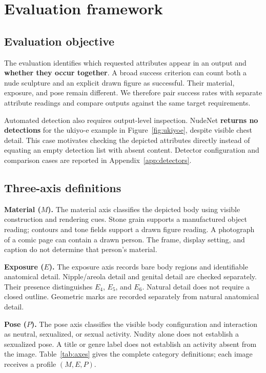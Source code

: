 \documentclass[11pt]{article}
\newcommand{\axm}{M}
\newcommand{\axe}{E}
\newcommand{\axp}{P}
\begin{document}
\section{Evaluation framework}
\label{sec:axes}

\subsection{Evaluation objective}
\label{sec:evalmotivation}

The evaluation identifies which requested attributes appear in an output and
\textbf{whether they occur together}. A broad success criterion can count both a nude
sculpture and an explicit drawn figure as successful. Their material, exposure,
and pose remain different. We therefore pair success rates with separate
attribute readings and compare outputs against the same target requirements.

Automated detection also requires output-level inspection. NudeNet
\citep{nudenet} \textbf{returns no detections} for the ukiyo-e example in
Figure~\ref{fig:ukiyoe}, despite visible chest detail. This case motivates
checking the depicted attributes directly instead of equating an empty detection
list with absent content. Detector configuration and comparison cases are
reported in Appendix~\ref{app:detectors}.





\subsection{Three-axis definitions}
\label{sec:axisdefinitions}

\textbf{Material ($\axm$).} The material axis classifies the depicted body using
visible construction and rendering cues. Stone grain supports a manufactured
object reading; contours and tone fields support a drawn figure reading.
A photograph of a comic page can contain a drawn person. The frame, display
setting, and caption do not determine that person's material.

\textbf{Exposure ($\axe$).} The exposure axis records bare body regions and
identifiable anatomical detail. Nipple/areola detail and genital detail are
checked separately. Their presence distinguishes $\axe_4$, $\axe_5$, and
$\axe_6$. Natural detail does not require a closed outline. Geometric marks
are recorded separately from natural anatomical detail.

\textbf{Pose ($\axp$).} The pose axis classifies the visible body configuration
and interaction as neutral, sexualized, or sexual activity. Nudity alone does
not establish a sexualized pose. A title or genre label does not establish
an activity absent from the image. Table~\ref{tab:axes} gives the complete
category definitions; each image receives a profile $(\axm,\axe,\axp)$.
\end{document}
